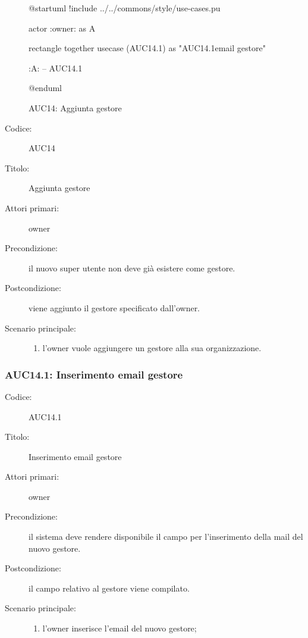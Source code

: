 \documentclass[../../../analisi-dei-requisiti.tex]{subfiles}
\begin{document}
\begin{figure}[H]
  \centering
  \begin{plantuml}
  @startuml
  !include ../../commons/style/use-cases.pu

  actor :owner: as A

  rectangle {
    together {
      usecase (AUC14.1) as "AUC14.1\nInserimento email gestore"
    }
  }

  :A: -- AUC14.1

  @enduml
  \end{plantuml}
  \caption{AUC14: Aggiunta gestore}%
  \label{fig:auc14}
\end{figure}

\begin{description}
  \item[Codice:] AUC14
  \item[Titolo:] Aggiunta gestore
  \item[Attori primari:] owner
  \item[Precondizione:] il nuovo super utente non deve già esistere come gestore.
  \item[Postcondizione:] viene aggiunto il gestore specificato dall'owner.
  \item[Scenario principale:]
  \begin{enumerate}
    \item l'owner vuole aggiungere un gestore alla sua organizzazione.
  \end{enumerate}
\end{description}

\subsubsection{AUC14.1: Inserimento email gestore}%
\label{subs:AUC14.1}
\begin{description}
  \item[Codice:] AUC14.1
  \item[Titolo:] Inserimento email gestore
  \item[Attori primari:] owner
  \item[Precondizione:] il sistema deve rendere disponibile il campo per l'inserimento della mail del nuovo gestore.
  \item[Postcondizione:] il campo relativo al gestore viene compilato.
  \item[Scenario principale:]
  \begin{enumerate}
    \item l'owner inserisce l'email del nuovo gestore;
  \end{enumerate}
\end{description}
\end{document}
